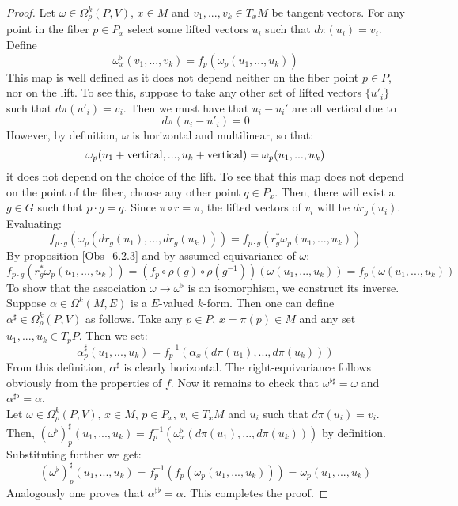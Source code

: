 \documentclass[12pt,a4paper]{report}
\theoremstyle{definition}
\theoremstyle{Theorem}
\theoremstyle{definition}
\theoremstyle{definition}
\begin{document}
	\begin{proof}
		Let $\omega\in\Omega^k_\rho(P,V)$, $x\in M$ and $v_1,...,v_k\in T_xM$ be tangent vectors. For any point in the fiber $p\in P_x$ select some lifted vectors $u_i$ such that $d\pi(u_i)=v_i$. Define $$\omega^\flat_x(v_1,...,v_k)=f_p(\omega_p(u_1,...,u_k))$$
		This map is well defined as it does not depend neither on the fiber point $p\in P$, nor on the lift. To see this, suppose to take any other set of lifted vectors $\{u'_i\}$ such that $d\pi(u'_i)=v_i$. Then we must have that $u_i-u_i'$ are  all vertical due to
		$$d\pi(u_i-u'_i)=0$$
		However, by definition, $\omega$ is horizontal and multilinear, so that:
		$$\omega_p(u_1+\hbox{vertical},...,u_k+\hbox{vertical})=\omega_p(u_1,...,u_k)$$
		it does not depend on the choice of the lift. To see that this map does not depend on the point of the fiber, choose any other point $q\in P_x$. Then, there will exist a $g\in G$ such that $p\cdot g=q$. Since $\pi\circ r=\pi$, the lifted vectors of $v_i$ will be $dr_g(u_i)$. Evaluating:
		$$f_{p\cdot g}(\omega_p(dr_g(u_1),...,dr_g(u_k)))=
		f_{p\cdot g}(r^*_g\omega_p(u_1,...,u_k))$$
		By proposition \ref{Obs_6.2.3} and by assumed equivariance of $\omega$:
		$$f_{p\cdot g}(r^*_g\omega_p(u_1,...,u_k))=(f_p\circ \rho(g)\circ \rho(g^{-1}))(\omega(u_1,...,u_k))=f_p(\omega(u_1,...,u_k))$$
		To show that the association $\omega\rightarrow\omega^\flat$ is an isomorphism, we construct its inverse. Suppose $\alpha\in\Omega^k(M,E)$ is a $E$-valued $k$-form. Then one can define $\alpha^\sharp\in \Omega^k_\rho(P,V)$ as follows. Take any $p\in P$, $x=\pi(p)\in M$ and any set $u_1,...,u_k\in T_pP$. Then we set:
		$$\alpha^\sharp_p(u_1,...,u_k)=f^{-1}_p(\alpha_x(d\pi(u_1),...,d\pi(u_k)))$$
		From this definition, $\alpha^\sharp$ is clearly horizontal. The right-equivariance follows obviously from the properties of $f$. Now it remains to check that $\omega^{\flat\sharp}=\omega$ and $\alpha^{\sharp\flat}=\alpha$.\\
		Let $\omega\in\Omega_\rho^k(P,V)$, $x\in M$, $p\in P_x$, $v_i\in T_xM$ and $u_i$ such that $d\pi(u_i)=v_i$.
		Then, $(\omega^\flat)^\sharp_p(u_1,...,u_k)=f^{-1}_p(\omega^\flat_x(d\pi(u_1),...,d\pi(u_k)))$ by definition. Substituting further we get:
		$$(\omega^\flat)^\sharp_p(u_1,...,u_k)=
		f^{-1}_p(f_p(\omega_p(u_1,...,u_k)))=\omega_p(u_1,...,u_k)$$
		Analogously one proves that $\alpha^{\sharp\flat}=\alpha$. This completes the proof.
	\end{proof}
\end{document}
